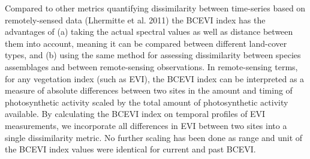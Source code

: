 	Compared to other metrics quantifying dissimilarity between time-series based on remotely-sensed data (Lhermitte et al. 2011) the BCEVI index has the advantages of (a) taking the actual spectral values as well as distance between them into account, meaning it can be compared between different land-cover types, and (b) using the same method for assessing dissimilarity between species assemblages and between remote-sensing observations. In remote-sensing terms, for any vegetation index (such as EVI), the BCEVI index can be interpreted as a measure of absolute differences between two sites in the amount and timing of photosynthetic activity scaled by the total amount of photosynthetic activity available. By calculating the BCEVI index on temporal profiles of EVI measurements, we incorporate all differences in EVI between two sites into a single dissimilarity metric. No further scaling has been done as range and unit of the BCEVI index values were identical for current and past BCEVI.

